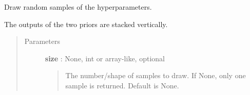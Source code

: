 \documentclass[letterpaper,10pt,english]{sphinxmanual}
\begin{document}
\begin{fulllineitems}
\begin{fulllineitems}
\label{gptools:gptools.utils.ProductJointPrior.random_draw}
Draw random samples of the hyperparameters.

The outputs of the two priors are stacked vertically.
\begin{quote}\begin{description}
\item[{Parameters}] \leavevmode
\textbf{size} : None, int or array-like, optional
\begin{quote}

The number/shape of samples to draw. If None, only one sample is
returned. Default is None.
\end{quote}

\end{description}\end{quote}

\end{fulllineitems}


\end{fulllineitems}

\end{document}

